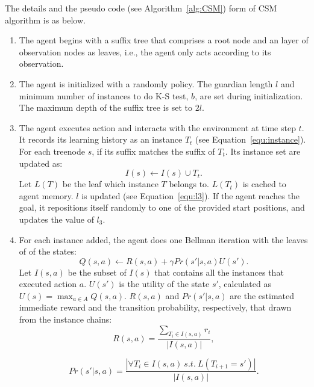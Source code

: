 \documentclass[conference]{IEEEtran}
\begin{document}
	The details and the pseudo code (see Algorithm~\ref{alg:CSM}) form of CSM algorithm is as below.
	
	\begin{enumerate}
		
		\item The agent begins with a suffix tree that comprises a root node and an layer of
		observation nodes as leaves, i.e., the agent only acts according to its observation.
		
		\item The agent is initialized with a randomly policy. The guardian length $l$ and
		minimum number of instances to do K-S test, $b$, are set during initialization. The
		maximum depth of the suffix tree is set to $2l$.
		
		\item The agent executes action and interacts with the environment at time step $t$.
		It records its learning history as an instance $T_t$ (see Equation~\ref{equ:instance}).
		For each treenode $s$, if its suffix matches the suffix of $T_t$. Its instance
		set are updated as:
		\begin{equation}
		I(s) \leftarrow I(s) \cup {T_t}.
		\end{equation}
		Let $L(T)$ be the leaf which instance $T$ belongs to. $L(T_t)$ is cached to agent memory.
		$l$ is updated (see Equation~\ref{equ:l3}). If the agent reaches the goal,
		it repositions itself randomly to one of the provided start positions, and updates
		the value of $l_3$.
		
		\item For each instance added, the agent does one Bellman iteration with the leaves of
		of the states:
		\begin{equation}
		Q(s,a) \leftarrow R(s,a)  + \gamma Pr(s'|s,a)U(s').
		\end{equation}
		Let $I(s,a)$ be the subset of $I(s)$ that contains all the instances that executed
		action $a$. $U(s')$ is the utility of the state $s'$, calculated as
		$U(s) = \max_{a \in A} Q(s,a)$. $R(s,a)$ and $Pr(s'|s,a)$ are the estimated immediate
		reward and the transition probability, respectively, that drawn from the instance chains:
		\begin{equation}
		R(s,a) = \frac{\sum_{T_i \in I(s,a)}r_i} {|I(s,a)|},
		\end{equation}
		
		\begin{equation}
		Pr(s'|s,a) = \frac{|\forall{T_i \in I(s,a) \ s.t. \ L(T_{i+1} = s')}|} {|I(s,a)|}.
		\end{equation}
		

\end{enumerate}
\end{document}
